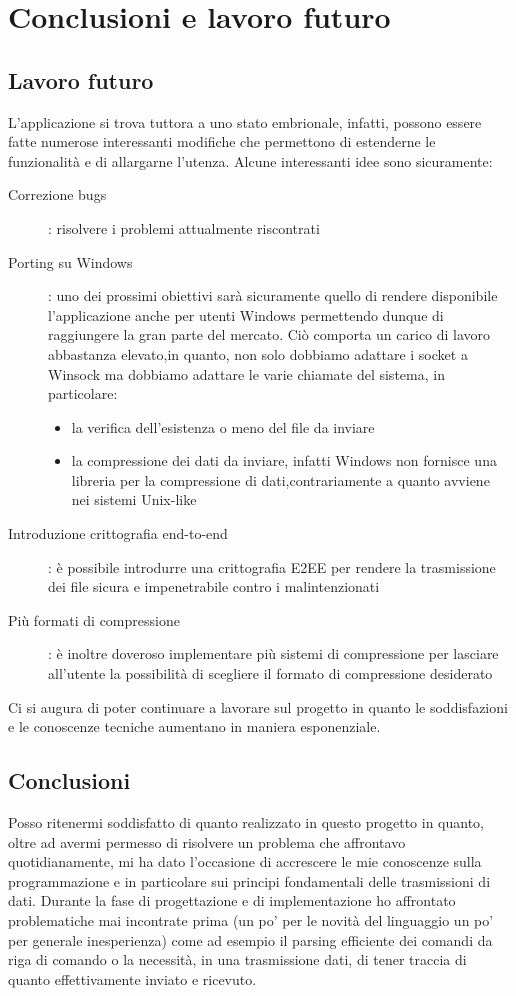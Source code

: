 \documentclass[11pt,fleqn]{book} %
\begin{document}

\chapter{Conclusioni e lavoro futuro}

\section{Lavoro futuro}
L'applicazione si trova tuttora a uno stato embrionale, infatti, possono essere fatte numerose interessanti modifiche che permettono di estenderne le funzionalità e di allargarne l'utenza. 
Alcune interessanti idee sono sicuramente:
\begin{description}
	\item[Correzione bugs]: risolvere i problemi attualmente riscontrati
	\item[Porting su Windows]: uno dei prossimi obiettivi sarà sicuramente quello di rendere disponibile l'applicazione anche per utenti Windows 			permettendo dunque di raggiungere la gran parte del mercato. Ciò comporta un carico di lavoro abbastanza elevato,in quanto, non solo dobbiamo 			adattare i socket a Winsock ma dobbiamo adattare le varie chiamate del sistema, in particolare:
			\begin{itemize}
				\item la verifica dell'esistenza o meno del file da inviare
				\item la compressione dei dati da inviare, infatti Windows non fornisce una libreria  per la compressione di dati,contrariamente a 					quanto avviene nei sistemi Unix-like
			\end{itemize}
	\item[Introduzione crittografia end-to-end]: è possibile introdurre una crittografia E2EE per rendere la trasmissione dei file sicura e 				impenetrabile contro i malintenzionati
	\item[Più formati di compressione]: è inoltre doveroso implementare più sistemi di compressione per lasciare all'utente la possibilità di 				scegliere il formato di compressione desiderato
\end{description}

Ci si augura di poter continuare a lavorare sul progetto in quanto le soddisfazioni e le conoscenze tecniche aumentano in maniera esponenziale.


\section{Conclusioni}
Posso ritenermi soddisfatto di quanto realizzato in questo progetto in quanto, oltre ad avermi permesso di risolvere un problema che affrontavo quotidianamente, mi ha dato l'occasione di accrescere le mie conoscenze sulla programmazione e in particolare sui principi fondamentali delle trasmissioni di dati.
Durante la fase di progettazione e di implementazione ho affrontato problematiche mai incontrate  prima (un po' per le novità del linguaggio un po' per generale inesperienza) come ad esempio il parsing efficiente dei comandi da riga di comando o la necessità, in una trasmissione dati, di tener traccia di quanto effettivamente inviato e ricevuto.
\end{document}
